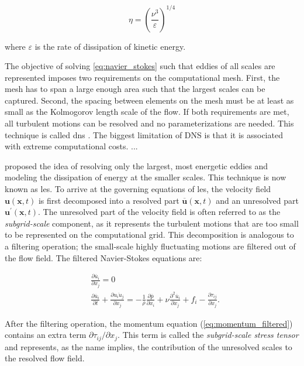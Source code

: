 \begin{equation}
    \eta = \left( \frac{\nu^3}{\varepsilon} \right)^{1/4}
    \label{eq:kolmogorov-length}
\end{equation}

where $\varepsilon$ is the rate of dissipation of kinetic energy.


The objective of solving \autoref{eq:navier_stokes} such that eddies of all scales are represented imposes two requirements on the computational mesh. First, the mesh has to span a large enough area such that the largest scales can be captured. Second, the spacing between elements on the mesh must be at least as small as the Kolmogorov length scale of the flow. If both requirements are met, all turbulent motions can be resolved and no parameterizations are needed. This technique is called \acrfull{dns} \citep{popeTurbulentFlows2000}. The biggest limitation of DNS is that it is associated with extreme computational costs. ...

\citet{smagorinskyGeneralCirculationExperiments1963} proposed the idea of resolving only the largest, most energetic eddies and modeling the dissipation of energy at the smaller scales. This technique is now known as \acrfull{les}. To arrive at the governing equations of \acrshort{les}, the velocity field $\mathbf{u}(\mathbf{x},t)$ is first decomposed into a resolved part $\overline{\mathbf{u}}(\mathbf{x},t)$ and an unresolved part $\mathbf{u}^\prime(\mathbf{x},t)$. The unresolved part of the velocity field is often referred to as the \emph{subgrid-scale} component, as it represents the turbulent motions that are too small to be represented on the computational grid. This decomposition is analogous to a filtering operation; the small-scale highly fluctuating motions are filtered out of the flow field. The filtered Navier-Stokes equations are:

\begin{align}
    &\frac{\partial \overline{u}_i}{\partial x_j} = 0 \label{eq:continuity_filtered}\\ 
    &\frac{\partial \overline{u}_i}{\partial t} + \frac{\partial \overline{u_i u_j}}{\partial x_j} = - \frac{1}{\rho} \frac{\partial \overline{p}}{\partial x_i} + \nu \frac{\partial^2 \overline{u}_i}{\partial x_j} + f_i - \frac{\partial \tau_{ij}}{\partial x_j}.  \label{eq:momentum_filtered}
\end{align}

After the filtering operation, the momentum equation (\autoref{eq:momentum_filtered}) contains an extra term $\partial \tau_{ij} / \partial x_j$. This term is called the \emph{subgrid-scale stress tensor} and represents, as the name implies, the contribution of the unresolved scales to the resolved flow field. 


